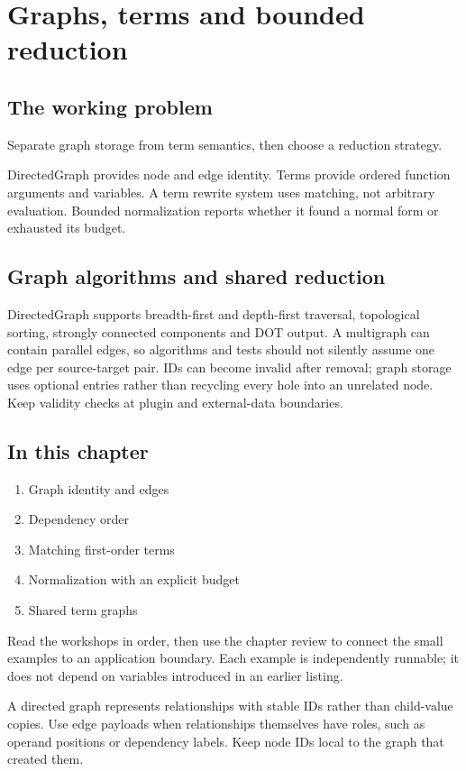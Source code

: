 \chapter{Graphs, terms and bounded reduction}\label{ch:8}
\section*{The working problem}
Separate graph storage from term semantics, then choose a reduction strategy.

DirectedGraph provides node and edge identity. Terms provide ordered function arguments and variables. A term rewrite system uses matching, not arbitrary evaluation. Bounded normalization reports whether it found a normal form or exhausted its budget.

\section*{Graph algorithms and shared reduction}
DirectedGraph supports breadth-first and depth-first traversal, topological sorting, strongly connected components and DOT output. A multigraph can contain parallel edges, so algorithms and tests should not silently assume one edge per source-target pair. IDs can become invalid after removal; graph storage uses optional entries rather than recycling every hole into an unrelated node. Keep validity checks at plugin and external-data boundaries.

\section*{In this chapter}
\begin{enumerate}
\item Graph identity and edges
\item Dependency order
\item Matching first-order terms
\item Normalization with an explicit budget
\item Shared term graphs
\end{enumerate}
Read the workshops in order, then use the chapter review to connect the small examples to an application boundary. Each example is independently runnable; it does not depend on variables introduced in an earlier listing.

\clearpage
{}
A directed graph represents relationships with stable IDs rather than child-value copies. Use edge payloads when relationships themselves have roles, such as operand positions or dependency labels. Keep node IDs local to the graph that created them.

